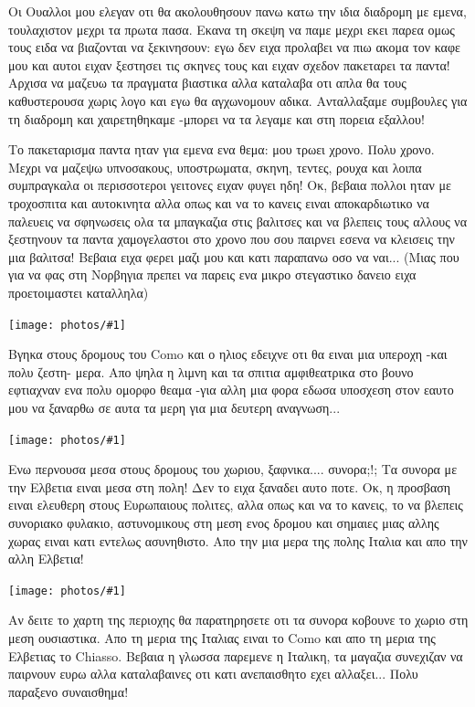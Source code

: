 \documentclass[11pt, letterpaper]{book}
\newcommand\photo[1]{\noindent\texttt{[image: photos/\#1]}}
\begin{document}
Οι Ουαλλοι μου ελεγαν οτι θα ακολουθησουν πανω κατω την ιδια διαδρομη με εμενα, τουλαχιστον μεχρι τα πρωτα πασα. Εκανα τη σκεψη να παμε μεχρι εκει παρεα ομως τους ειδα να βιαζονται να ξεκινησουν: εγω δεν ειχα προλαβει να πιω ακομα τον καφε μου και αυτοι ειχαν ξεστησει τις σκηνες τους και ειχαν σχεδον πακεταρει τα παντα! 
Αρχισα να μαζευω τα πραγματα βιαστικα αλλα καταλαβα οτι απλα θα τους καθυστερουσα χωρις λογο και εγω θα αγχωνομουν αδικα. Ανταλλαξαμε συμβουλες για τη διαδρομη και χαιρετηθηκαμε -μπορει να τα λεγαμε και στη πορεια εξαλλου!

Το πακεταρισμα παντα ηταν για εμενα ενα θεμα: μου τρωει χρονο. Πολυ χρονο. Μεχρι να μαζεψω υπνοσακους, υποστρωματα, σκηνη, τεντες, ρουχα και λοιπα συμπραγκαλα οι περισσοτεροι γειτονες ειχαν φυγει ηδη! Οκ, βεβαια πολλοι ηταν με τροχοσπιτα και αυτοκινητα αλλα οπως και να το κανεις ειναι αποκαρδιωτικο να παλευεις να σφηνωσεις ολα τα μπαγκαζια στις βαλιτσες και να βλεπεις τους αλλους να ξεστηνουν τα παντα χαμογελαστοι στο χρονο που σου παιρνει εσενα να κλεισεις την μια βαλιτσα! 
Βεβαια ειχα φερει μαζι μου και κατι παραπανω οσο να ναι... (Μιας που για να φας στη Νορβηγια πρεπει να παρεις ενα μικρο στεγαστικο δανειο ειχα προετοιμαστει καταλληλα)

\photo{22.jpg}

Βγηκα στους δρομους του Como και ο ηλιος εδειχνε οτι θα ειναι μια υπεροχη -και πολυ ζεστη- μερα. 
Απο ψηλα η λιμνη και τα σπιτια αμφιθεατρικα στο βουνο εφτιαχναν ενα πολυ ομορφο θεαμα -για αλλη μια φορα εδωσα υποσχεση στον εαυτο μου να ξαναρθω σε αυτα τα μερη για μια δευτερη αναγνωση...

\photo{23.jpg}

Ενω περνουσα μεσα στους δρομους του χωριου, ξαφνικα.... συνορα;!; Τα συνορα με την Ελβετια ειναι μεσα στη πολη! 
Δεν το ειχα ξαναδει αυτο ποτε. Οκ, η προσβαση ειναι ελευθερη στους Ευρωπαιους πολιτες, αλλα οπως και να το κανεις, το να βλεπεις συνοριακο φυλακιο, αστυνομικους στη μεση ενος δρομου και σημαιες μιας αλλης χωρας ειναι κατι εντελως ασυνηθιστο. 
Απο την μια μερα της πολης Ιταλια και απο την αλλη Ελβετια!

\photo{24.jpg}

Αν δειτε το χαρτη της περιοχης θα παρατηρησετε οτι τα συνορα κοβουνε το χωριο στη μεση ουσιαστικα. Απο τη μερια της Ιταλιας ειναι το Como και απο τη μερια της Ελβετιας το Chiasso. Βεβαια η γλωσσα παρεμενε η Ιταλικη, τα μαγαζια συνεχιζαν να παιρνουν ευρω αλλα καταλαβαινες οτι κατι ανεπαισθητο εχει αλλαξει... Πολυ παραξενο συναισθημα! 
\end{document}
